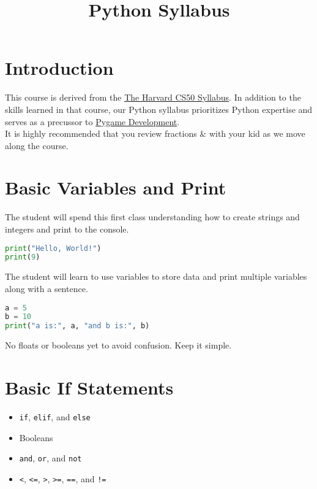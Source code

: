 \documentclass{article}
\title{\vspace{-3em}Python Syllabus\vspace{-3em}}
\begin{document}
\fontsize{14}{16}\selectfont
\maketitle
\tableofcontents

\section{Introduction}
This course is derived from the \href{https://cs50.harvard.edu/python/2022/syllabus/}{\underline{The Harvard CS50 Syllabus}}. In addition to the skills learned in that course, our Python syllabus prioritizes Python expertise and serves as a precussor to \href{https://www.pygame.org/wiki/about}{Pygame Development}. \\

It is highly recommended that you review fractions \& with your kid as we move along the course.

\section{Basic Variables and Print}
The student will spend this first class understanding how to create strings and integers and print to the console. \\

\begin{lstlisting}[language=Python]
print("Hello, World!")
print(9)
\end{lstlisting}

The student will learn to use variables to store data and print multiple variables along with a sentence.

\begin{lstlisting}[language=Python]
a = 5
b = 10
print("a is:", a, "and b is:", b)
\end{lstlisting}

No floats or booleans yet to avoid confusion. Keep it simple.

\section{Basic If Statements}

\begin{itemize}
    \item \verb|if|, \verb|elif|, and \verb|else|
    \item Booleans
    \item \verb|and|, \verb|or|, and \verb|not|
    \item \verb|<|, \verb|<=|, \verb|>|, \verb|>=|, \verb|==|, and \verb|!=|
\end{itemize}
\end{document}
